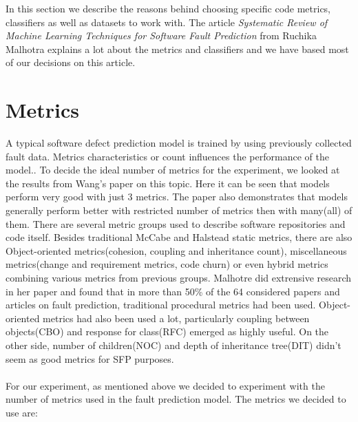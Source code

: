 In this section we describe the reasons behind choosing specific code metrics, classifiers as well as datasets to work with. The article \textit{Systematic Review of Machine Learning Techniques for Software Fault Prediction}\cite{malhotra2015systematic} from Ruchika Malhotra explains a lot about the metrics and classifiers and we have based most of our decisions on this article.
\section{Metrics}
A typical software defect prediction model is trained by using previously collected fault data. Metrics characteristics or count influences the performance of the model.\cite{wang2011many}. To decide the ideal number of metrics for the experiment, we looked at the results from Wang's paper on this topic\cite{wang2011many}. Here it can be seen that models perform very good with just 3 metrics. The paper also demonstrates that models generally perform better with restricted number of metrics then with many(all) of them. There are several metric groups used to describe software repositories and code itself. Besides traditional McCabe and Halstead static metrics, there are also Object-oriented metrics(cohesion, coupling and inheritance count), miscellaneous metrics(change and requirement metrics, code churn) or even hybrid metrics combining various metrics from previous groups. Malhotre did extrensive research in her paper and found that in more than 50\% of the 64 considered papers and articles on fault prediction, traditional procedural metrics had been used. Object-oriented metrics had also been used a lot\cite{radjenovic2013software}, particularly coupling between objects(CBO) and response for class(RFC) emerged as highly useful. On the other side, number of children(NOC) and depth of inheritance tree(DIT) didn't seem as good metrics for SFP purposes\cite[p.~15]{malhotra2015systematic}.\\\\
For our experiment, as mentioned above we decided to experiment with the number of metrics used in the fault prediction model. The metrics we decided to use are:\\
